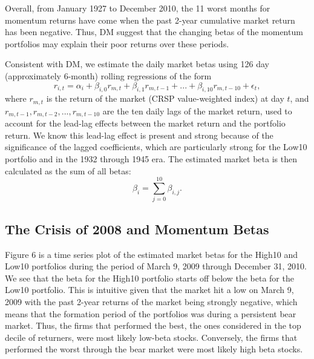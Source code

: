 \documentclass[12pt]{article}
\begin{document}
Overall, from January 1927 to December 2010, the 11 worst months for momentum returns have come when the past 2-year cumulative market return has been negative. Thus, DM suggest that the changing betas of the momentum portfolios may explain their poor returns over these periods.

Consistent with DM, we estimate the daily market betas using 126 day (approximately 6-month) rolling regressions of the form
\begin{equation}
r_{i,t}=\alpha_{i}+\beta_{i,0}r_{m,t}+\beta_{i,1}r_{m,t-1}+...+\beta_{i,10}r_{m,t-10}+\epsilon_{t},
\end{equation}
where $r_{m,t}$ is the return of the market (CRSP value-weighted index) at day $t$, and $r_{m,t-1}, r_{m,t-2},...,r_{m,t-10}$ are the ten daily lags of the market return, used to account for the lead-lag effects between the market return and the portfolio return. We know this lead-lag effect is present and strong because of the significance of the lagged coefficients, which are particularly strong for the Low10 portfolio and in the 1932 through 1945 era. The estimated market beta is then calculated as the sum of all betas: \[\beta_{i}=\sum_{j=0}^{10}\beta_{i,j}.\]

\subsection{The Crisis of 2008 and Momentum Betas}

Figure 6 is a time series plot of the estimated market betas for the High10 and Low10 portfolios during the period of March 9, 2009 through December 31, 2010. We see that the beta for the High10 portfolio starts off below the beta for the Low10 portfolio. This is intuitive given that the market hit a low on March 9, 2009 with the past 2-year returns of the market being strongly negative, which means that the formation period of the portfolios was during a persistent bear market. Thus, the firms that performed the best, the ones considered in the top decile of returners, were most likely low-beta stocks. Conversely, the firms that performed the worst through the bear market were most likely high beta stocks.
\end{document}

